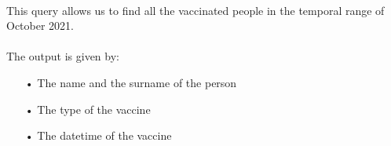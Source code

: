 \documentclass[a4paper,12pt]{article}
\begin{document}
\paragraph{} This query allows us to find all the vaccinated people in the temporal range of October 2021.
\begin{center}
\end{center}
\paragraph{} The output is given by: 
\begin{itemize}
\item[•] The name and the surname of the person
\item[•] The type of the vaccine
\item[•] The datetime of the vaccine
\begin{center}
\end{center}
\end{itemize}
\pagebreak
\end{document}
